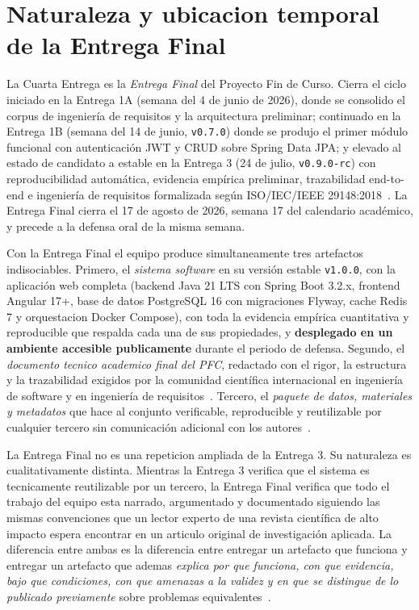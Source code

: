 \documentclass[11pt,a4paper]{article}
\begin{document}
\section{Naturaleza y ubicacion temporal de la Entrega Final}

La Cuarta Entrega es la \emph{Entrega Final} del Proyecto Fin de Curso. Cierra el ciclo iniciado en la Entrega 1A (semana del 4 de junio de 2026), donde se consolido el corpus de ingenier\'{i}a de requisitos y la arquitectura preliminar; continuado en la Entrega 1B (semana del 14 de junio, \texttt{v0.7.0}) donde se produjo el primer m\'{o}dulo funcional con autenticaci\'{o}n JWT y CRUD sobre Spring Data JPA; y elevado al estado de candidato a estable en la Entrega 3 (24 de julio, \texttt{v0.9.0-rc}) con reproducibilidad autom\'{a}tica, evidencia emp\'{i}rica preliminar, trazabilidad end-to-end e ingenier\'{i}a de requisitos formalizada seg\'{u}n ISO/IEC/IEEE 29148:2018~\cite{iso29148,ralph2021empirical}. La Entrega Final cierra el 17 de agosto de 2026, semana 17 del calendario acad\'{e}mico, y precede a la defensa oral de la misma semana.

Con la Entrega Final el equipo produce simultaneamente tres artefactos indisociables. Primero, el \emph{sistema software} en su versi\'{o}n estable \texttt{v1.0.0}, con la aplicaci\'{o}n web completa (backend Java 21 LTS con Spring Boot 3.2.x, frontend Angular 17+, base de datos PostgreSQL 16 con migraciones Flyway, cache Redis 7 y orquestacion Docker Compose), con toda la evidencia emp\'{i}rica cuantitativa y reproducible que respalda cada una de sus propiedades, y \textbf{desplegado en un ambiente accesible publicamente} durante el periodo de defensa. Segundo, el \emph{documento tecnico academico final del PFC}, redactado con el rigor, la estructura y la trazabilidad exigidos por la comunidad cient\'{i}fica internacional en ingenier\'{i}a de software y en ingenier\'{i}a de requisitos~\cite{ralph2021empirical,washizaki2024swebok,iso29148,pohl2010requirements,wiegers2013software}. Tercero, el \emph{paquete de datos, materiales y metadatos} que hace al conjunto verificable, reproducible y reutilizable por cualquier tercero sin comunicaci\'{o}n adicional con los autores~\cite{wilkinson2016fair,sandve2013ten,peng2011reproducible,acm2020artifact}.

La Entrega Final no es una repeticion ampliada de la Entrega 3. Su naturaleza es cualitativamente distinta. Mientras la Entrega 3 verifica que el sistema es tecnicamente reutilizable por un tercero, la Entrega Final verifica que todo el trabajo del equipo esta narrado, argumentado y documentado siguiendo las mismas convenciones que un lector experto de una revista cient\'{i}fica de alto impacto espera encontrar en un articulo original de investigaci\'{o}n aplicada. La diferencia entre ambas es la diferencia entre entregar un artefacto que funciona y entregar un artefacto que ademas \emph{explica por que funciona, con que evidencia, bajo que condiciones, con que amenazas a la validez y en que se distingue de lo publicado previamente} sobre problemas equivalentes~\cite{hevner2004design,peffers2007design,ralph2021empirical}.
\end{document}
